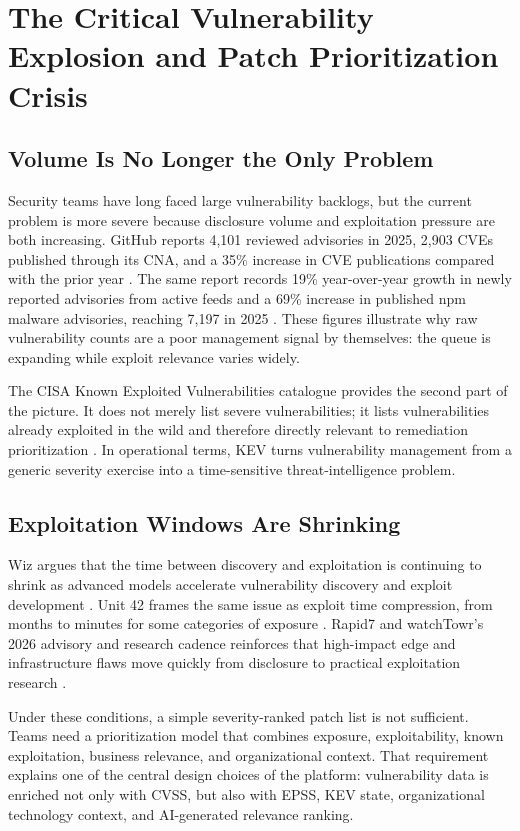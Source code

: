 \section{The Critical Vulnerability Explosion and Patch Prioritization Crisis}
\subsection{Volume Is No Longer the Only Problem}
Security teams have long faced large vulnerability backlogs, but the current problem is more severe because disclosure volume and exploitation pressure are both increasing. GitHub reports 4,101 reviewed advisories in 2025, 2,903 CVEs published through its CNA, and a 35\% increase in CVE publications compared with the prior year \cite{github_oss_trends_2026}. The same report records 19\% year-over-year growth in newly reported advisories from active feeds and a 69\% increase in published npm malware advisories, reaching 7,197 in 2025 \cite{github_oss_trends_2026}. These figures illustrate why raw vulnerability counts are a poor management signal by themselves: the queue is expanding while exploit relevance varies widely.

The CISA Known Exploited Vulnerabilities catalogue provides the second part of the picture. It does not merely list severe vulnerabilities; it lists vulnerabilities already exploited in the wild and therefore directly relevant to remediation prioritization \cite{cisa_kev}. In operational terms, KEV turns vulnerability management from a generic severity exercise into a time-sensitive threat-intelligence problem.

\subsection{Exploitation Windows Are Shrinking}
Wiz argues that the time between discovery and exploitation is continuing to shrink as advanced models accelerate vulnerability discovery and exploit development \cite{wiz_ai_readiness_2026}. Unit 42 frames the same issue as exploit time compression, from months to minutes for some categories of exposure \cite{unit42_frontier_ai_2026}. Rapid7 and watchTowr's 2026 advisory and research cadence reinforces that high-impact edge and infrastructure flaws move quickly from disclosure to practical exploitation research \cite{rapid7_blog_2026,watchtowr_labs_2026}.

Under these conditions, a simple severity-ranked patch list is not sufficient. Teams need a prioritization model that combines exposure, exploitability, known exploitation, business relevance, and organizational context. That requirement explains one of the central design choices of the platform: vulnerability data is enriched not only with CVSS, but also with EPSS, KEV state, organizational technology context, and AI-generated relevance ranking.

